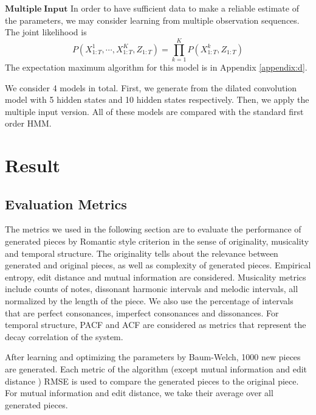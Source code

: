 \documentclass[10pt, oneside]{article}
\begin{document}
$\mathbf{Multiple\; Input}$
In order to have sufficient data to make a reliable estimate of the parameters, we may consider learning from multiple observation sequences. The joint likelihood is 
$$
P(X^{1}_{1:T},\cdots, X^{K}_{1:T},Z_{1:T})=\prod_{k=1}^{K} P(X^{k}_{1:T}, Z_{1:T})
$$
The expectation maximum algorithm for this model is in Appendix \ref{appendix:d}.

We consider 4 models in total. First, we generate from the dilated convolution model with 5 hidden states and 10 hidden states respectively. Then, we apply the multiple input version. All of these models are compared with the standard first order HMM.

\section{Result}
\subsection{Evaluation Metrics }
The metrics we used in the following section are to evaluate the performance of generated pieces  by Romantic style criterion in the sense of originality, musicality and temporal structure. The originality tells about the relevance between generated and original pieces, as well as complexity of generated pieces. Empirical entropy, edit distance and mutual information are considered. Musicality metrics include counts of notes, dissonant harmonic intervals and melodic intervals, all normalized by the length of the piece. We also use the percentage of intervals that are perfect consonances, imperfect consonances and dissonances. For temporal structure, PACF and ACF are considered as metrics that represent the decay correlation of the system. 

After learning and optimizing the parameters by Baum-Welch, 1000 new pieces are generated. Each metric of the algorithm (except mutual information and edit distance ) RMSE is used to compare the generated pieces to the original piece. For mutual information and edit distance, we take their average over all generated pieces.
\end{document}
